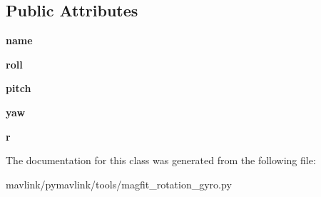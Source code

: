 \subsection*{Public Attributes}
\begin{DoxyCompactItemize}
\item 
\mbox{\label{classpymavlink_1_1tools_1_1magfit__rotation__gyro_1_1Rotation_a35ff5b76a58e457f04b53806305a78b8}} 
{\bfseries name}
\item 
\mbox{\label{classpymavlink_1_1tools_1_1magfit__rotation__gyro_1_1Rotation_a87366b9bb41c2b076b1bbe7a4fefb3c7}} 
{\bfseries roll}
\item 
\mbox{\label{classpymavlink_1_1tools_1_1magfit__rotation__gyro_1_1Rotation_a8d07ae7ab64afb5cada12087248ec304}} 
{\bfseries pitch}
\item 
\mbox{\label{classpymavlink_1_1tools_1_1magfit__rotation__gyro_1_1Rotation_a042cd272704a4136a52a3889f9e77266}} 
{\bfseries yaw}
\item 
\mbox{\label{classpymavlink_1_1tools_1_1magfit__rotation__gyro_1_1Rotation_a2181e0e89c6aaf31a073b4ba66fb5f49}} 
{\bfseries r}
\end{DoxyCompactItemize}


The documentation for this class was generated from the following file\+:\begin{DoxyCompactItemize}
\item 
mavlink/pymavlink/tools/magfit\+\_\+rotation\+\_\+gyro.\+py\end{DoxyCompactItemize}
